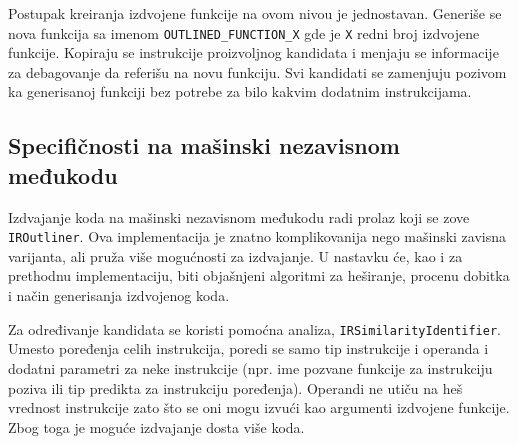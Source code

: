 \documentclass[12pt,oneside]{memoir}
\begin{document}
Postupak kreiranja izdvojene funkcije na ovom nivou je jednostavan.
Generiše se nova funkcija sa imenom \verb|OUTLINED_FUNCTION_X| gde je \verb|X| redni broj izdvojene funkcije.
Kopiraju se instrukcije proizvoljnog kandidata i menjaju se informacije za debagovanje da referišu na novu funkciju.
Svi kandidati se zamenjuju pozivom ka generisanoj funkciji bez potrebe za bilo kakvim dodatnim instrukcijama.

\subsection{Specifičnosti na mašinski nezavisnom međukodu}


Izdvajanje koda na mašinski nezavisnom međukodu radi prolaz koji se zove \verb|IROutliner|.
Ova implementacija je znatno komplikovanija nego mašinski zavisna varijanta, ali pruža više mogućnosti za izdvajanje.
U nastavku će, kao i za prethodnu implementaciju, biti objašnjeni algoritmi za heširanje, procenu dobitka i način generisanja izdvojenog koda.

Za određivanje kandidata se koristi pomoćna analiza, \verb|IRSimilarityIdentifier|.
Umesto poređenja celih instrukcija, poredi se samo tip instrukcije i operanda i dodatni parametri za neke instrukcije (npr. ime pozvane funkcije za instrukciju poziva ili tip predikta za instrukciju poređenja).
Operandi ne utiču na heš vrednost instrukcije zato što se oni mogu izvući kao argumenti izdvojene funkcije.
Zbog toga je moguće izdvajanje dosta više koda.
\end{document}
